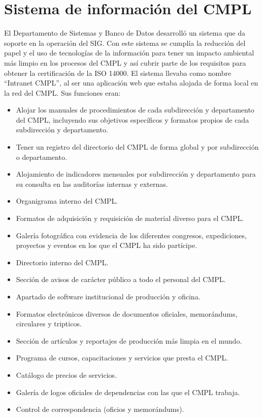 	\section{Sistema de información del CMPL}
	El Departamento de Sistemas y Banco de Datos desarrolló un sistema que da soporte en la operación del SIG. Con este sistema se cumplía la reducción del papel y el uso de tecnologías de la información para tener un impacto ambiental más limpio en los procesos del CMPL  y así cubrir parte de los requisitos para obtener la certificación de la ISO 14000. El sistema llevaba como nombre ``Intranet CMPL'', al ser una aplicación web que estaba alojada de forma local en la red del CMPL. Sus funciones eran:\\
	
	\begin{itemize}
		\item Alojar los manuales de procedimientos de cada subdirección y departamento del CMPL, incluyendo sus objetivos específicos y formatos propios de cada subdirección y departamento.
		\item Tener un registro del directorio del CMPL de forma global y por subdirección o departamento. 
		\item Alojamiento de indicadores mensuales por subdirección y departamento para su consulta en las auditorías internas y externas.
		\item Organigrama interno del CMPL.
		\item Formatos de adquisición y requisición de material diverso para el CMPL.
		\item Galería fotográfica con evidencia de los diferentes congresos, expediciones, proyectos y eventos en los que el CMPL ha sido partícipe.
		\item Directorio interno del CMPL.
		\item Sección de avisos de carácter público a todo el personal del CMPL. 
		\item Apartado de software institucional de producción y oficina.
		\item Formatos electrónicos diversos de documentos oficiales, memorándums, circulares y tripticos.
		\item Sección de artículos y reportajes de producción más limpia en el mundo.
		\item Programa de cursos, capacitaciones y servicios que presta el CMPL.
		\item Catálogo de precios de servicios.
		\item Galería de logos oficiales de dependencias con las que el CMPL trabaja.
		\item Control de correspondencia (oficios y memorándums).
	\end{itemize}
	
